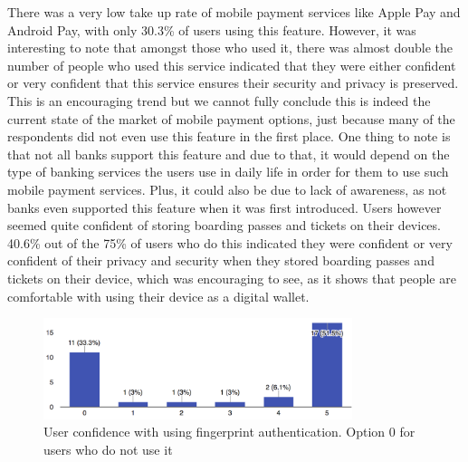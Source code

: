 \documentclass{sigchi}
\begin{document}
There was a very low take up rate of mobile payment services like Apple Pay and Android Pay, with only 30.3\% of users using this feature. However, it was interesting to note that amongst those who used it, there was almost double the number of people who used this service indicated that they were either confident or very confident that this service ensures their security and privacy is preserved. This is an encouraging trend but we cannot fully conclude this is indeed the current state of the market of mobile payment options, just because many of the respondents did not even use this feature in the first place. One thing to note is that not all banks support this feature and due to that, it would depend on the type of banking services the users use in daily life in order for them to use such mobile payment services. Plus, it could also be due to lack of awareness, as not banks even supported this feature when it was first introduced. Users however seemed quite confident of storing boarding passes and tickets on their devices. 40.6\% out of the 75\% of users who do this indicated they were confident or very confident of their privacy and security when they stored boarding passes and tickets on their device, which was encouraging to see, as it shows that people are comfortable with using their device as a digital wallet.

\begin{figure}[h]
    \includegraphics[height=2.95cm]{fingerprint}
    \caption{User confidence with using fingerprint authentication. Option 0 for users who do not use it}
    \label{fig:fingerprint}
\end{figure}
\end{document}
